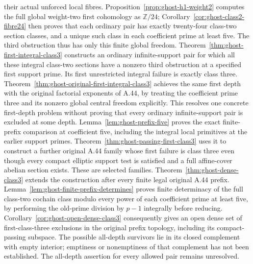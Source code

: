 their actual unforced local fibres. Proposition~\ref{prop:ghost-h1-weight2}
computes the full global weight-two first cohomology as
\(\mathbb Z/24\); Corollary~\ref{cor:ghost-class2-fibre24}
then proves that each ordinary pair has exactly twenty-four
class-two section classes, and a unique such class in each
coefficient prime at least five. The third obstruction thus
has only this finite global freedom.
Theorem~\ref{thm:ghost-first-integral-class3} constructs an
ordinary infinite-support pair for which all these integral
class-two sections have a nonzero third obstruction at a
specified first support prime. Its first unrestricted
integral failure is exactly class three.
Theorem~\ref{thm:ghost-original-first-integral-class3}
achieves the same first depth with the original factorial
exponents of A.44, by treating the coefficient prime three
and its nonzero global central freedom explicitly. This resolves one
concrete first-depth problem without proving that every
ordinary infinite-support pair is excluded at some depth.
Lemma~\ref{lem:ghost-prefix-five} proves the exact
finite-prefix comparison at coefficient five, including
the integral local primitives at the earlier support
primes. Theorem~\ref{thm:ghost-passing-first-class3}
uses it to construct a further original A.44 family
whose first failure is class three even though every
compact elliptic support test is satisfied and a full
affine-cover abelian section exists. These are selected
families. Theorem~\ref{thm:ghost-dense-class3} extends the
construction after every finite legal original A.44 prefix.
Lemma~\ref{lem:ghost-finite-prefix-determines} proves finite
determinacy of the full class-two cochain class modulo every
power of each coefficient prime at least five, by performing
the old-prime division by \(p-1\) integrally before reducing.
Corollary~\ref{cor:ghost-open-dense-class3} consequently gives
an open dense set of first-class-three exclusions in the
original prefix topology, including its compact-passing
subspace. The possible all-depth survivors lie in its closed
complement with empty interior; emptiness or nonemptiness of
that complement has not been established. The all-depth
assertion for every allowed pair remains unresolved.

